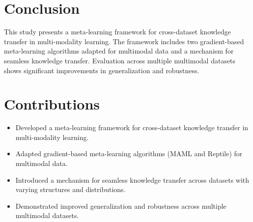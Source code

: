 \documentclass{article}
\begin{document}
\section{Conclusion}
This study presents a meta-learning framework for cross-dataset knowledge transfer in multi-modality learning. The framework includes two gradient-based meta-learning algorithms adapted for multimodal data and a mechanism for seamless knowledge transfer. Evaluation across multiple multimodal datasets shows significant improvements in generalization and robustness.

\section{Contributions}
\begin{itemize}
    \item Developed a meta-learning framework for cross-dataset knowledge transfer in multi-modality learning.
    \item Adapted gradient-based meta-learning algorithms (MAML and Reptile) for multimodal data.
    \item Introduced a mechanism for seamless knowledge transfer across datasets with varying structures and distributions.
    \item Demonstrated improved generalization and robustness across multiple multimodal datasets.
\end{itemize}
\end{document}
